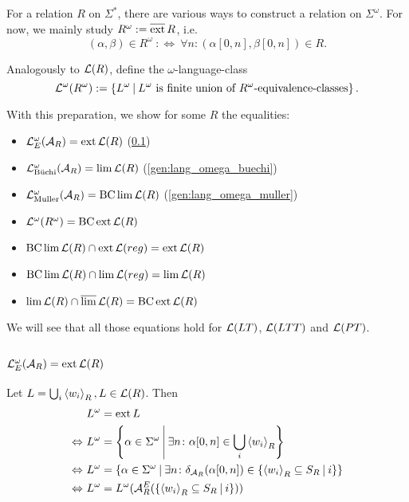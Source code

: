 For a relation $R$ on $\Sigma^*$, there are various ways to construct a relation on $\Sigma^\omega$. For now, we mainly study $R^\omega := \operatorname{\overline{ext}} R$, i.e.
\[ (\alpha,\beta) \in R^\omega \ :\Leftrightarrow \ \forall n \colon (\alpha[0,n],\beta[0,n]) \in R . \]

Analogously to $\mathcal{L}(R)$, define the $\omega$-language-class
\[ \Lang^\omega(R^\omega) := \Set{L^\omega}{\text{$L^\omega$ is finite union of $R^\omega$-equivalence-classes}} . \]

With this preparation, we show for some $R$ the equalities:
\begin{itemize}
\item $\mathcal{L}^\omega_E(\mathcal{A}_R) = \operatorname{ext} \mathcal{L}(R)$ (\ref{gen:lang_omega_e})
\item $\mathcal{L}^\omega_{\text{Büchi}}(\mathcal{A}_R) = \lim \mathcal{L}(R)$ (\ref{gen:lang_omega_buechi})
\item $\mathcal{L}^\omega_{\text{Muller}}(\mathcal{A}_R) = \operatorname{BC} \lim \mathcal{L}(R)$ (\ref{gen:lang_omega_muller})
\item $\mathcal{L}^\omega(R^\omega) = \operatorname{BC} \operatorname{ext} \mathcal{L}(R)$
\item $\operatorname{BC} \lim \mathcal{L}(R) \cap \operatorname{ext} \mathcal{L}(reg) = \operatorname{ext} \mathcal{L}(R)$
\item $\operatorname{BC} \lim \mathcal{L}(R) \cap \lim \mathcal{L}(reg) = \lim \mathcal{L}(R)$
\item $\lim \mathcal{L}(R) \cap \operatorname{\overline{lim}} \mathcal{L}(R) = \operatorname{BC} \operatorname{ext} \mathcal{L}(R)$
\end{itemize}

We will see that all those equations hold for $\mathcal{L}(LT)$, $\mathcal{L}(LTT)$ and $\mathcal{L}(PT)$.

\subsection{$\mathcal{L}^\omega_E(\mathcal{A}_R) = \operatorname{ext} \mathcal{L}(R)$}
\label{gen:lang_omega_e}
Let $L = \bigcup_i \left< w_i\right>_R, L \in \mathcal{L}(R)$. Then
\begin{align*}
& L^\omega = \ext L \\
\Leftrightarrow \ & L^\omega = \Set{\alpha \in \Sigma^\omega}{\exists n \colon \alpha[0,n] \in \bigcup_i \left< w_i\right>_R} \\
\Leftrightarrow \ & L^\omega = \Set{\alpha \in \Sigma^\omega}{\exists n \colon \delta_{\A_R}(\alpha[0,n]) \in \Set{\left< w_i\right>_R \subseteq S_R}{i}} \\
\Leftrightarrow \ & L^\omega = L^\omega(\A^E_R(\Set{\left< w_i\right>_R \subseteq S_R}{i}))
\end{align*}

